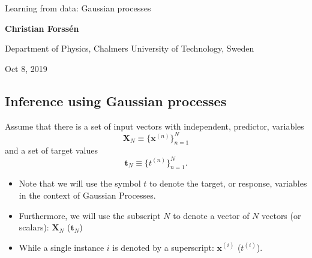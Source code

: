 \documentclass[%
oneside,                 %
final,                   %
10pt]{article}
\begin{document}

\newcommand{\exercisesection}[1]{\subsection*{#1}}







\thispagestyle{empty}

\begin{center}
{\LARGE\bf
\begin{spacing}{1.25}
Learning from data: Gaussian processes
\end{spacing}
}
\end{center}


\begin{center}
{\bf Christian Forssén}
\end{center}

    \begin{center}
\centerline{{\small Department of Physics, Chalmers University of Technology, Sweden}}
\end{center}
    

\begin{center}
Oct 8, 2019
\end{center}

\vspace{1cm}


\subsection{Inference using Gaussian processes}

Assume that there is a set of input vectors with independent, predictor, variables
\[ \boldsymbol{X}_N \equiv \{ \boldsymbol{x}^{(n)}\}_{n=1}^N \]
and a set of target values
\[ \boldsymbol{t}_N \equiv \{ t^{(n)}\}_{n=1}^N. \]

\begin{itemize}
\item Note that we will use the symbol $t$ to denote the target, or response, variables in the context of Gaussian Processes. 

\item Furthermore, we will use the subscript $N$ to denote a vector of $N$ vectors (or scalars): $\boldsymbol{X}_N$ ($\boldsymbol{t}_N$)

\item While a single instance $i$ is denoted by a superscript: $\boldsymbol{x}^{(i)}$ ($t^{(i)}$).
\end{itemize}
\end{document}
